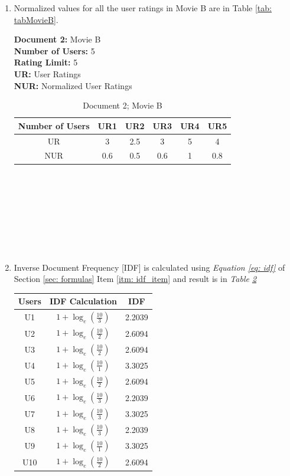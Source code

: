 \documentclass[12pt, titlepage, onecolumn]{article}
\begin{document}
{\begin{enumerate}
	\item Normalized values for all the user ratings in Movie B are in Table \ref{tab: tabMovieB}.
	
		{\bf Document 2: } Movie B\\
		{\bf Number of Users: }5\\
		{\bf Rating Limit: }5\\
		{\bf UR: }User Ratings\\
		{\bf NUR: }Normalized User Ratings	
		\begin{table}[ht]
		\label{tab: tabMovieB}
		\begin{center}
		\begin{tabular}{cccccc}
    		\hline
       			Number of Users	&	UR1	&	UR2	&	UR3	&	UR4	&	UR5\\
		\hline
    			UR				&	3	&	2.5	&	3	&	5	&	4\\
			NUR				&	0.6	&	0.5	&	0.6	&	1	&	0.8\\
    		\hline
		\end{tabular}
		\caption{Document 2; Movie B}
		\end{center}
		\label{tab:movieB}
		\end{table}
		\\
		\\
		\\
		\\
		\\
		\\
		\\
	\item Inverse Document Frequency [IDF] is calculated using \emph{Equation \ref{eq: idf}} of Section \ref{sec: formulas} Item \ref{itm: idf_item} and result is in \emph{Table \ref{tab: tabidf}}
	\begin{table}[ht]
	\label{tab: tabidf}
		\begin{center}
		\begin{tabular}{|c|c|c|}
    		\hline
       			Users	&	IDF Calculation					&	IDF\\
		\hline
    			U1		&	$1+\log_{e}(\frac{10}{3})$			&	2.2039\\
			U2		&	$1+\log_{e}(\frac{10}{2})$			&	2.6094\\
			U3		&	$1+\log_{e}(\frac{10}{2})$			&	2.6094\\
			U4		&	$1+\log_{e}(\frac{10}{1})$			&	3.3025\\
			U5		&	$1+\log_{e}(\frac{10}{2})$			&	2.6094\\
			U6		&	$1+\log_{e}(\frac{10}{3})$			&	2.2039\\
			U7		&	$1+\log_{e}(\frac{10}{3})$			&	3.3025\\
			U8		&	$1+\log_{e}(\frac{10}{3})$			&	2.2039\\
			U9		&	$1+\log_{e}(\frac{10}{1})$			&	3.3025\\
			U10		&	$1+\log_{e}(\frac{10}{2})$			&	2.6094\\
			

\end{tabular}
\end{center}
\end{table}
\end{enumerate}}
\end{document}
